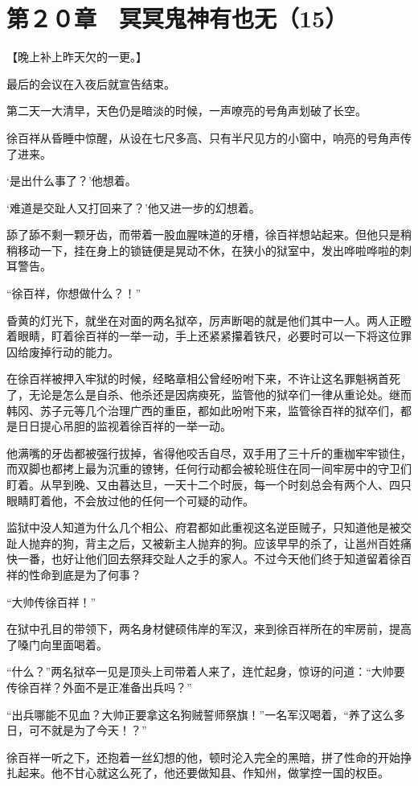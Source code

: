 \section{第２０章　冥冥鬼神有也无（15）}

【晚上补上昨天欠的一更。】

最后的会议在入夜后就宣告结束。

第二天一大清早，天色仍是暗淡的时候，一声嘹亮的号角声划破了长空。

徐百祥从昏睡中惊醒，从设在七尺多高、只有半尺见方的小窗中，响亮的号角声传了进来。

‘是出什么事了？’他想着。

‘难道是交趾人又打回来了？’他又进一步的幻想着。

舔了舔不剩一颗牙齿，而带着一股血腥味道的牙槽，徐百祥想站起来。但他只是稍稍移动一下，挂在身上的锁链便是晃动不休，在狭小的狱室中，发出哗啦哗啦的刺耳警告。

“徐百祥，你想做什么？！”

昏黄的灯光下，就坐在对面的两名狱卒，厉声断喝的就是他们其中一人。两人正瞪着眼睛，盯着徐百祥的一举一动，手上还紧紧攥着铁尺，必要时可以一下将这位罪囚给废掉行动的能力。

在徐百祥被押入牢狱的时候，经略章相公曾经吩咐下来，不许让这名罪魁祸首死了，无论是怎么是自杀、他杀还是因病瘐死，监管他的狱卒们一律从重论处。继而韩冈、苏子元等几个治理广西的重臣，都如此吩咐下来，监管徐百祥的狱卒们，都是日日提心吊胆的监视着徐百祥的一举一动。

他满嘴的牙齿都被强行拔掉，省得他咬舌自尽，双手用了三十斤的重枷牢牢锁住，而双脚也都拷上最为沉重的镣铐，任何行动都会被轮班住在同一间牢房中的守卫们盯着。从早到晚、又由暮达旦，一天十二个时辰，每一个时刻总会有两个人、四只眼睛盯着他，不会放过他的任何一个可疑的动作。

监狱中没人知道为什么几个相公、府君都如此重视这名逆臣贼子，只知道他是被交趾人抛弃的狗，背主之后，又被新主人抛弃的狗。应该早早的杀了，让邕州百姓痛快一番，也好让他们回去祭拜交趾人之手的家人。不过今天他们终于知道留着徐百祥的性命到底是为了何事？

“大帅传徐百祥！”

在狱中孔目的带领下，两名身材健硕伟岸的军汉，来到徐百祥所在的牢房前，提高了嗓门向里面喝着。

“什么？”两名狱卒一见是顶头上司带着人来了，连忙起身，惊讶的问道：“大帅要传徐百祥？外面不是正准备出兵吗？”

“出兵哪能不见血？大帅正要拿这名狗贼誓师祭旗！”一名军汉喝着，“养了这么多日，可不就是为了今天！？”

徐百祥一听之下，还抱着一丝幻想的他，顿时沦入完全的黑暗，拼了性命的开始挣扎起来。他不甘心就这么死了，他还要做知县、作知州，做掌控一国的权臣。

